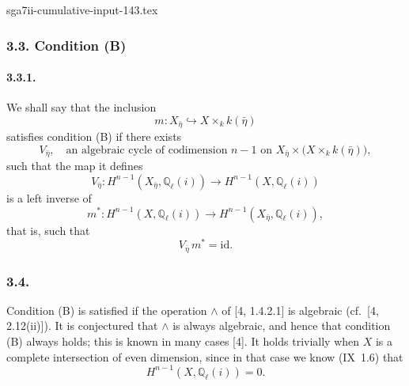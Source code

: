 \begin{filecontents*}{sga7ii-cumulative-input-143.tex}
\subsubsection*{3.3. Condition (B)}

\paragraph{3.3.1.}
We shall say that the inclusion
\begin{equation*}
m:X_{\bar\eta}\hookrightarrow X\times_k k(\bar\eta)
\end{equation*}
satisfies condition (B) if there exists
\begin{equation}\tag{3.3.2}
V_{\bar\eta},\quad
\text{an algebraic cycle of codimension $n-1$ on }
X_{\bar\eta}\times\bigl(X\times_k k(\bar\eta)\bigr),
\end{equation}
such that the map it defines
\begin{equation}\tag{3.3.3}
V_{\bar\eta}:H^{n-1}(X_{\bar\eta},\mathbb Q_\ell(i))
\longrightarrow H^{n-1}(X,\mathbb Q_\ell(i))
\end{equation}
is a left inverse of
\begin{equation}\tag{3.3.4}
m^*:H^{n-1}(X,\mathbb Q_\ell(i))
\longrightarrow H^{n-1}(X_{\bar\eta},\mathbb Q_\ell(i)),
\end{equation}
that is, such that
\begin{equation}\tag{3.3.5}
V_{\bar\eta}\,m^*=\mathrm{id}.
\end{equation}

\subsubsection*{3.4.}
Condition (B) is satisfied if the operation $\wedge$ of [4, 1.4.2.1]
is algebraic (cf.~[4, 2.12(ii)]).  It is conjectured that $\wedge$ is
always algebraic, and hence that condition (B) always holds; this is
known in many cases [4].  It holds trivially when $X$ is a complete
intersection of even dimension, since in that case we know (IX~1.6)
that
\begin{equation}\tag{3.4.1}
H^{n-1}(X,\mathbb Q_\ell(i))=0.
\end{equation}
\end{filecontents*}
